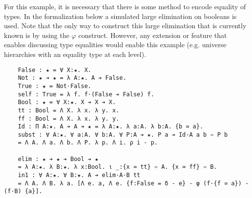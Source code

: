\begin{enumerate}
{        For this example, it is necessary that there is some method to encode equality of types.
        In the formalization below a simulated large elimination on booleans is used.
        Note that the only way to construct this large elimination that is currently known is by using the $\varphi$ construct.
        However, any extension or feature that enables discussing type equalities would enable this example (e.g. universe hierarchies with an equality type at each level).
\begin{verbatim}
    False : ★ = ∀ X:★. X.
    Not : ★ ➔ ★ = λ A:★. A ➔ False.
    True : ★ = Not·False.
    self : True = λ f. f·(False ➔ False) f.
    Bool : ★ = ∀ X:★. X ➔ X ➔ X.
    tt : Bool = Λ X. λ x. λ y. x.
    ff : Bool = Λ X. λ x. λ y. y.
    Id : Π A:★. A ➔ A ➔ ★ = λ A:★. λ a:A. λ b:A. {b ≃ a}.
    subst : ∀ A:★. ∀ a:A. ∀ b:A. ∀ P:A ➔ ★. P a ➔ Id·A a b ➾ P b
    = Λ A. Λ a. Λ b. Λ P. λ p. Λ i. ρ i - p.
    
    elim : ★ ➔ ★ ➔ Bool ➔ ★
    = λ A:★. λ B:★. λ x:Bool. ι _:{x ≃ tt} ➾ A. {x ≃ ff} ➾ B.
    in1 : ∀ A:★. ∀ B:★. A ➔ elim·A·B tt
    = Λ A. Λ B. λ a. [Λ e. a, Λ e. {f:False = δ - e} - φ (f·{f ≃ a}) - (f·B) {a}].
    

\end{verbatim}}
\end{enumerate}

